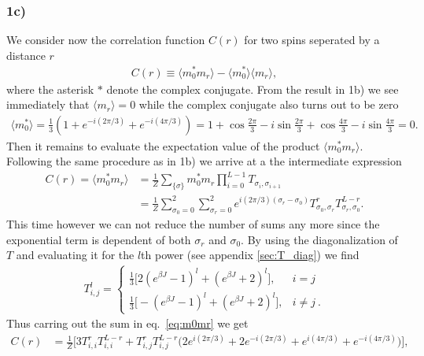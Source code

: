 \documentclass[reprint, amsmath, amssymb, aps, onecolumn]{revtex4-2}
\begin{document}
\subsubsection*{1c)}
\noindent We consider now the correlation function $C(r)$ for two spins seperated by a distance $r$
\begin{align*}
  C(r) \equiv \langle m_{0}^{*} m_{r}\rangle-\langle m_{0}^{*}\rangle\langle m_{r}\rangle,
\end{align*}
where the asterisk $*$ denote the complex conjugate. From the result in 1b) we see immediately that $\langle m_r \rangle = 0$ while the complex conjugate also turns out to be zero 
\begin{align*}
  \langle m_0^* \rangle =  \frac{1}{3}\left(1 + e^{-i (2\pi/3)} +  e^{-i (4\pi/3)}\right) = 1 + \cos{\frac{2\pi}{3}} - i\sin{\frac{2\pi}{3}} + \cos{\frac{4\pi}{3}} - i\sin{\frac{4\pi}{3}} = 0.
\end{align*}
Then it remains to evaluate the expectation value of the product $\langle m_0^*m_r \rangle$. Following the same procedure as in 1b) we arrive at a the intermediate expression
\begin{align}
  C(r) = \langle m_0^*m_r \rangle  &= \frac{1}{Z} \sum_{\{\sigma\}} m_0^*m_r \prod_{i=0}^{L-1} T_{\sigma_i,\sigma_{i+1}} \nonumber \\
  &= \frac{1}{Z} \sum_{\sigma_0 = 0}^2 \sum_{\sigma_r = 0}^2 e^{i (2\pi/3) (\sigma_r - \sigma_0)} T_{\sigma_0, \sigma_r}^r T_{\sigma_r, \sigma_0}^{L-r}. \label{eq:m0mr}
\end{align}
This time however we can not reduce the number of sums any more since the exponential term is dependent of both $\sigma_r$ and $\sigma_0$. By using the diagonalization of $T$ and evaluating it for the $l$th power (see appendix \ref{sec:T_diag}) we find
\begin{align*}
  T^l_{i,j} = 
  \begin{cases}
    \frac{1}{3}\Big[ 2(e^{\beta J} - 1)^l + (e^{\beta J} + 2)^l\Big], & i = j \\[8 pt]
    \frac{1}{3}\Big[ -(e^{\beta J} - 1)^l + (e^{\beta J} + 2)^l \Big], & i \neq j \ .
  \end{cases}
\end{align*}
Thus carring out the sum in eq.~\eqref{eq:m0mr} we get
\begin{align*}
  C(r) &= \frac{1}{Z}\Big[3T_{i,i}^rT_{i,i}^{L-r} + T_{i,j}^rT_{i,j}^{L-r}\Big( 2e^{i(2\pi/3)} + 2e^{-i(2\pi/3)} + e^{i(4\pi/3)} + e^{-i(4\pi/3)} \Big)\Big],
\end{align*}
\end{document}
